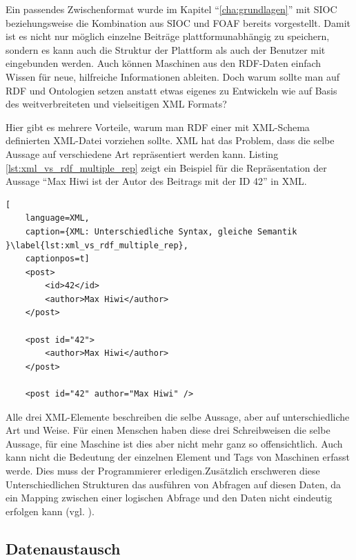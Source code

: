 Ein passendes Zwischenformat wurde im Kapitel \enquote{\ref{cha:grundlagen}} mit SIOC beziehungsweise die Kombination aus SIOC und FOAF bereits vorgestellt. Damit ist es nicht nur möglich einzelne Beiträge plattformunabhängig zu speichern, sondern es kann auch die Struktur der Plattform als auch der Benutzer mit eingebunden werden. Auch können Maschinen aus den RDF-Daten einfach Wissen für neue, hilfreiche Informationen ableiten. Doch warum sollte man auf RDF und Ontologien setzen anstatt etwas eigenes zu Entwickeln wie auf Basis des weitverbreiteten und vielseitigen XML Formats?

Hier gibt es mehrere Vorteile, warum man RDF einer mit XML-Schema definierten XML-Datei vorziehen sollte. XML hat das Problem, dass die selbe Aussage auf verschiedene Art repräsentiert werden kann. Listing \ref{lst:xml_vs_rdf_multiple_rep} zeigt ein Beispiel für die Repräsentation der Aussage \enquote{Max Hiwi ist der Autor des Beitrags mit der ID 42} in XML.

\begin{lstlisting}[
    language=XML,
    caption={XML: Unterschiedliche Syntax, gleiche Semantik }\label{lst:xml_vs_rdf_multiple_rep},
    captionpos=t]
    <post>
        <id>42</id>
        <author>Max Hiwi</author>
    </post>

    <post id="42">
        <author>Max Hiwi</author>
    </post>

    <post id="42" author="Max Hiwi" />
\end{lstlisting}

Alle drei XML-Elemente beschreiben die selbe Aussage, aber auf unterschiedliche Art und Weise. Für einen Menschen haben diese drei Schreibweisen die selbe Aussage, für eine Maschine ist dies aber nicht mehr ganz so offensichtlich. Auch kann nicht die Bedeutung der einzelnen Element und Tags von Maschinen erfasst werde. Dies muss der Programmierer erledigen.Zusätzlich erschweren diese Unterschiedlichen Strukturen das ausführen von Abfragen auf diesen Daten, da ein Mapping zwischen einer logischen Abfrage und den Daten nicht eindeutig erfolgen kann (vgl. \cite[s.\,41]{Schroder2003a}).



\subsection{Datenaustausch} %
\label{sub:datenaustausch}

